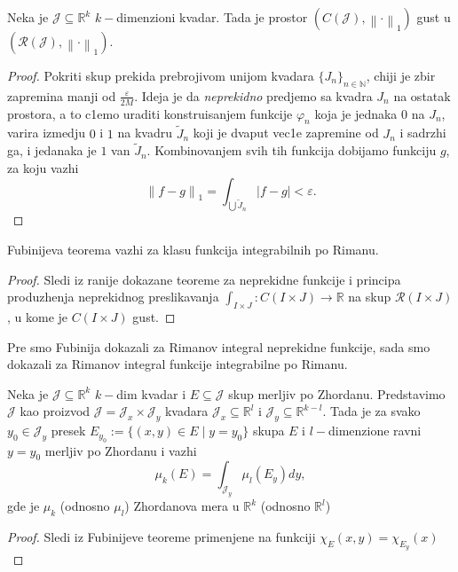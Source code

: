 \documentclass[a4paper,12pt]{article}
\newcommand{\NN}{\mathbb{N}}
\newcommand{\RR}{\mathbb{R}}
\newcommand{\eps}{\varepsilon}
\newcommand{\psj}{\subseteq}
\newcommand{\norm}[1]{\left\lVert#1\right\rVert}
\begin{document}
\begin{tvr}
	Neka je $\mathcal J \psj \RR^k$ $k-$dimenzioni kvadar. Tada je prostor $(C(\mathcal J), \norm{\cdot}_1)$
	gust u $(\mathcal R(\mathcal J), \norm{\cdot}_1)$.
\end{tvr}
\begin{proof}
	Pokriti skup prekida prebrojivom unijom kvadara $\{J_n\}_{n \in \NN}$, chiji je zbir zapre\-mina manji od $ \frac{\eps}{2M}$. Ideja
	je da \textit{neprekidno} predjemo sa kvadra $J_n$ na ostatak prostora, a to c1emo uraditi konstruisanjem funkcije
	$\varphi_n$ koja je jednaka $0$ na $J_n$, varira izmedju $0$ i $1$ na kvadru $\widetilde{J}_n$ koji je dvaput vec1e zapremine
	od $J_n$ i sadrzhi ga, i jedanaka je $1$ van $\widetilde{J}_n$. Kombinovanjem svih tih funkcija dobijamo funkciju $g$,
	za koju vazhi 
	\[  \norm{f - g}_1 = \int_{\bigcup \widetilde{J}_n} |f-g| < \eps.\] 
\end{proof}

\begin{tvr}
	Fubinijeva teorema vazhi za klasu funkcija integrabilnih po Rimanu.
\end{tvr}
\begin{proof}
	Sledi iz ranije dokazane teoreme za neprekidne funkcije i principa produzhenja neprekidnog preslikavanja
	$\int_{I\times J}: C(I\times J) \to \RR$ na skup $\mathcal R(I\times J)$, u kome je $C(I\times J)$ gust.
\end{proof}

\begin{nap}
	Pre smo Fubinija dokazali za Rimanov integral neprekidne funkcije, sada smo dokazali za Rimanov integral funkcije 
	integrabilne po Rimanu.
\end{nap}

\begin{tma}
	Neka je $\mathcal J \psj \RR^k$ $k-$dim kvadar i $E\psj \mathcal J$ skup merljiv po Zhordanu. Predstavimo $\mathcal J$
	kao proizvod $\mathcal J = \mathcal J_x \times \mathcal J_y$ kvadara $\mathcal J_x \psj \RR^l$ i $\mathcal J_y \psj \RR^{k-l}$.
	Tada je za svako $y_0 \in \mathcal J_y$ presek $E_{y_0} := \{(x, y) \in E \mid y = y_0\}$ skupa $E$ i $l-$dimenzione ravni $y=y_0$
	merljiv po Zhordanu i vazhi 
	\[ \mu_k(E) = \int_{\mathcal J_y} \mu_l (E_y)dy ,\] 
	gde je $\mu_k$ (odnosno $\mu_l$) Zhordanova mera u $\RR^k$ (odnosno $\RR^l$)
\end{tma}
\begin{proof}
	Sledi iz Fubinijeve teoreme primenjene na funkciji $\chi_E(x, y) = \chi_{E_y}(x)$
\end{proof}
\end{document}
